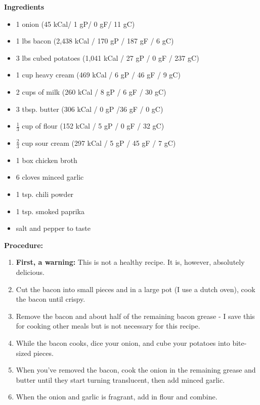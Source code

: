 \begin{multicols}{2}
\textbf{Ingredients}
\begin{itemize}
\item 1 onion \quad (45 kCal/ 1 gP/ 0 gF/ 11 gC)
\item 1 lbs bacon \quad (2,438 kCal / 170 gP / 187 gF / 6 gC)
\item 3 lbs cubed potatoes \quad (1,041 kCal / 27 gP / 0 gF / 237 gC) 
\item 1 cup heavy cream \quad (469 kCal / 6 gP / 46 gF / 9 gC)
\item 2 cups of milk  \quad (260 kCal / 8 gP / 6 gF / 30 gC)
\item 3 tbsp. butter \quad (306 kCal / 0 gP /36 gF / 0 gC) 
\item $\frac{1}{3}$ cup of flour \quad (152 kCal / 5 gP / 0 gF / 32 gC) 
\item $\frac{2}{3}$ cup sour cream \quad (297 kCal / 5 gP / 45 gF / 7 gC)
\item 1 box chicken broth 
\item 6 cloves minced garlic
\item 1 tsp. chili powder
\item 1 tsp. smoked paprika
\item salt and pepper to taste 


\end{itemize}


\columnbreak
\textbf{Procedure:}
\medskip


\begin{enumerate}
\item \textbf{First, a warning:} This is not a healthy recipe. It is, however, absolutely delicious. 
\item Cut the bacon into small pieces and in a large pot (I use a dutch oven), cook the bacon until crispy. \item Remove the bacon and about half of the remaining bacon grease - I save this for cooking other meals but is not necessary for this recipe. 


\medskip
\item While the bacon cooks, dice your onion, and cube your potatoes into bite-sized pieces. 
\item When you've removed the bacon, cook the onion in the remaining grease and butter until they start turning translucent, then add minced garlic. 

\item When the onion and garlic is fragrant, add in flour and combine. 


\end{enumerate}
\end{multicols}
